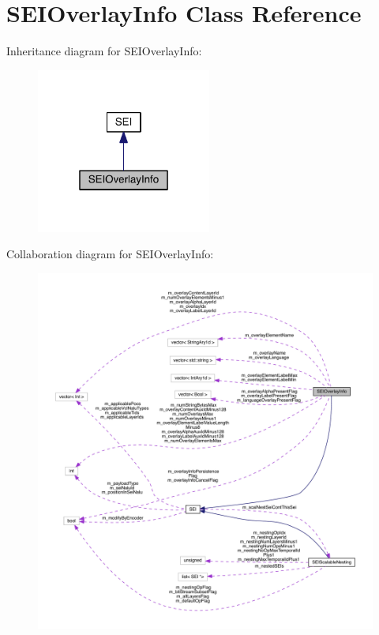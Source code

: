 \hypertarget{class_s_e_i_overlay_info}{}\section{S\+E\+I\+Overlay\+Info Class Reference}
\label{class_s_e_i_overlay_info}


Inheritance diagram for S\+E\+I\+Overlay\+Info\+:
\nopagebreak
\begin{figure}[H]
\begin{center}
\leavevmode
\includegraphics[width=163pt]{dd/dd2/class_s_e_i_overlay_info__inherit__graph}
\end{center}
\end{figure}


Collaboration diagram for S\+E\+I\+Overlay\+Info\+:
\nopagebreak
\begin{figure}[H]
\begin{center}
\leavevmode
\includegraphics[width=350pt]{da/dcd/class_s_e_i_overlay_info__coll__graph}
\end{center}
\end{figure}
